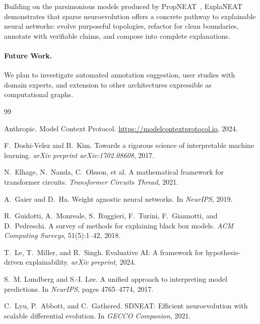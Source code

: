 \documentclass[11pt]{article}
\begin{document}
Building on the parsimonious models produced by PropNEAT~\cite{merry2025propneat}, ExplaNEAT demonstrates that sparse neuroevolution offers a concrete pathway to explainable neural networks: evolve purposeful topologies, refactor for clean boundaries, annotate with verifiable claims, and compose into complete explanations.

\paragraph{Future Work.} We plan to investigate automated annotation suggestion, user studies with domain experts, and extension to other architectures expressible as computational graphs.



\begin{thebibliography}{99}

Anthropic.
\newblock Model Context Protocol.
\newblock \url{https://modelcontextprotocol.io}, 2024.

F.~Doshi-Velez and B.~Kim.
\newblock Towards a rigorous science of interpretable machine learning.
\newblock \emph{arXiv preprint arXiv:1702.08608}, 2017.

N.~Elhage, N.~Nanda, C.~Olsson, et al.
\newblock A mathematical framework for transformer circuits.
\newblock \emph{Transformer Circuits Thread}, 2021.

A.~Gaier and D.~Ha.
\newblock Weight agnostic neural networks.
\newblock In \emph{NeurIPS}, 2019.

R.~Guidotti, A.~Monreale, S.~Ruggieri, F.~Turini, F.~Giannotti, and D.~Pedreschi.
\newblock A survey of methods for explaining black box models.
\newblock \emph{ACM Computing Surveys}, 51(5):1--42, 2018.

T.~Le, T.~Miller, and R.~Singh.
\newblock Evaluative AI: A framework for hypothesis-driven explainability.
\newblock \emph{arXiv preprint}, 2024.

S.~M. Lundberg and S.-I. Lee.
\newblock A unified approach to interpreting model predictions.
\newblock In \emph{NeurIPS}, pages 4765--4774, 2017.

C.~Lyu, P.~Abbott, and C.~Gathered.
\newblock SDNEAT: Efficient neuroevolution with scalable differential evolution.
\newblock In \emph{GECCO Companion}, 2021.


\end{thebibliography}
\end{document}
